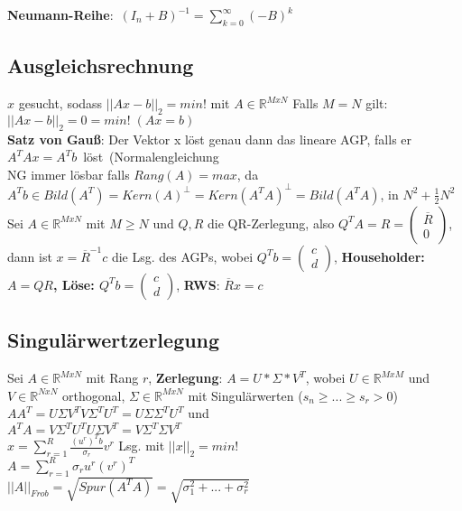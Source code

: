 \mbox{\textbf{Neumann-Reihe}: $(I_n + B)^{-1} = \sum_{k=0}^\infty (-B)^k$}

\subsection{Ausgleichsrechnung}
$x$ gesucht, sodass $||Ax-b||_2 = min!$ mit $A \in \mathbb{R}^{MxN}$
Falls $M=N$ gilt: $||Ax-b||_2 = 0 = min! \;(Ax = b)$\\
\textbf{Satz von Gauß}: Der Vektor x löst genau dann das lineare AGP, falls er \mbox{$A^TAx = A^Tb$ löst (Normalengleichung}\\
NG immer lösbar falls $Rang(A) = max$, da $A^Tb \in Bild(A^T) = Kern(A)^{\bot} = Kern(A^TA)^{\bot} = Bild(A^TA)$, in $N^2 + \frac{1}{2}N^2$\\
Sei $A \in \mathbb{R}^{MxN}$ mit $M \geq N$ und $Q, R$ die QR-Zerlegung, also $Q^TA = R = \begin{pmatrix} \overline{R} \\ 0 \end{pmatrix}$, dann ist $x = \overline{R}^{-1}c$ die Lsg. des AGPs, wobei $Q^Tb = \begin{pmatrix} c \\ d \end{pmatrix}$, \textbf{Householder: $A = QR$,
\textbf{Löse}: $Q^Tb = \begin{pmatrix} c \\ d \end{pmatrix}$}, \textbf{RWS}: $\overline{R}x = c$
\subsection{Singulärwertzerlegung}
Sei $A \in \mathbb{R}^{MxN}$ mit Rang $r$,
\textbf{Zerlegung}: $A = U * \Sigma * V^T$, wobei $U \in \mathbb{R}^{MxM}$ und $V \in \mathbb{R}^{NxN}$ orthogonal,  $\Sigma \in \mathbb{R}^{MxN}$ mit Singulärwerten ($s_n \geq ... \geq s_r > 0$)\\
$AA^T = U\Sigma V^TV\Sigma^TU^T = U\Sigma \Sigma^TU^T$ und\\
$A^TA = V\Sigma^TU^TU\Sigma V^T = V\Sigma^T \Sigma V^T$ \\
$x = \sum_{r=1}^R\frac{(u^r)^Tb}{\sigma_r}v^r$ Lsg. mit $||x||_2=min!$\\
$A=\sum_{r=1}^R\sigma_ru^r(v^r)^T$\\ %
$||A||_{Frob} = \sqrt{Spur(A^TA)} = \sqrt{\sigma_1^2 + ... + \sigma_r^2}$